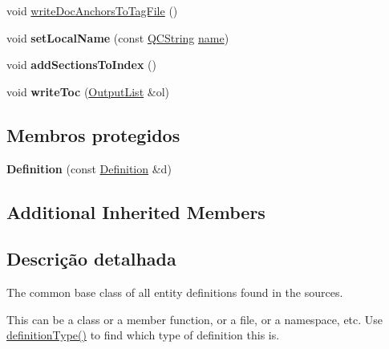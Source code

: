 \begin{DoxyCompactItemize}
\item 
void \hyperlink{class_definition_a0ff8658509384f90b086887377cb2276}{write\-Doc\-Anchors\-To\-Tag\-File} ()
\item 
\hypertarget{class_definition_aec1d365c4ce42c7cccb98c105a8f5ddd}{void {\bfseries set\-Local\-Name} (const \hyperlink{class_q_c_string}{Q\-C\-String} \hyperlink{class_definition_a2c310e06c9aadc6fb218f80fcbb5c695}{name})}\label{class_definition_aec1d365c4ce42c7cccb98c105a8f5ddd}

\item 
\hypertarget{class_definition_a710d558cced0b8b8f015ada3d8536851}{void {\bfseries add\-Sections\-To\-Index} ()}\label{class_definition_a710d558cced0b8b8f015ada3d8536851}

\item 
\hypertarget{class_definition_a8f24b0dbc9f7cb7cfe6c7ce809d62eb2}{void {\bfseries write\-Toc} (\hyperlink{class_output_list}{Output\-List} \&ol)}\label{class_definition_a8f24b0dbc9f7cb7cfe6c7ce809d62eb2}

\end{DoxyCompactItemize}
\subsection*{Membros protegidos}
\begin{DoxyCompactItemize}
\item 
\hypertarget{class_definition_a2c438e546c793e8827074fbf926f1207}{{\bfseries Definition} (const \hyperlink{class_definition}{Definition} \&d)}\label{class_definition_a2c438e546c793e8827074fbf926f1207}

\end{DoxyCompactItemize}
\subsection*{Additional Inherited Members}


\subsection{Descrição detalhada}
The common base class of all entity definitions found in the sources.

This can be a class or a member function, or a file, or a namespace, etc. Use \hyperlink{class_definition_intf_afba7add835518dbf4202846446d667b0}{definition\-Type()} to find which type of definition this is. 

